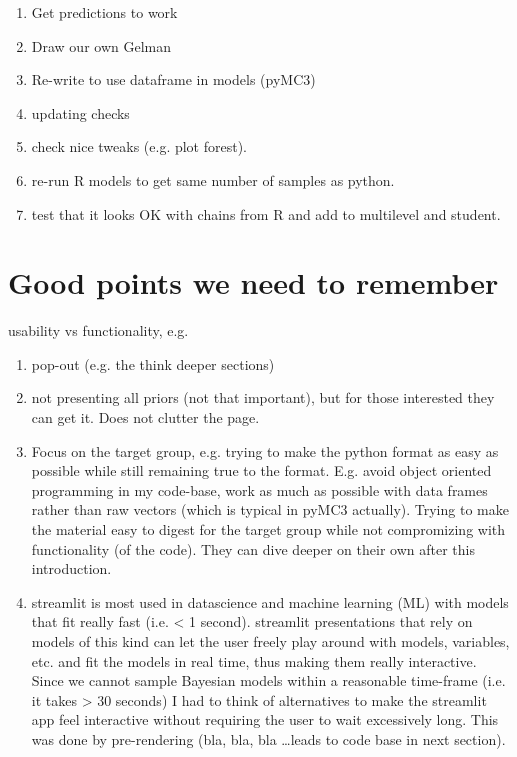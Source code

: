 \documentclass[12pt]{article}
\begin{document}
\begin{enumerate}
	\item Get predictions to work \\
	\item Draw our own Gelman \\
	\item Re-write to use dataframe in models (pyMC3) \\
	\item updating checks \\
	\item check nice tweaks (e.g. plot forest). \\
	\item re-run R models to get same number of samples as python. \\
	\item test that it looks OK with chains from R and add to multilevel
		and student.
\end{enumerate}

\section{Good points we need to remember}

usability vs functionality, e.g.
\begin{enumerate}
	\item pop-out (e.g. the think deeper sections) \\
	\item not presenting all priors (not that important), but for those
		interested they can get it. Does not clutter the page. \\
	\item Focus on the target group, e.g. trying to make the python format
		as easy as possible while still remaining true to the format.
		E.g. avoid object oriented programming in my code-base,
		work as much as possible with data frames rather than raw
		vectors (which is typical in pyMC3 actually). Trying to make
		the material easy to digest for the target group while not
		compromizing with functionality (of the code). They can dive
		deeper on their own after this introduction. \\
	\item streamlit is most used in datascience and machine learning (ML)
		with models that fit really fast (i.e. < 1 second). streamlit
		presentations that rely on models of this kind can let the user
		freely play around with models, variables, etc. and fit the
		models in real time, thus making them really interactive.
		Since we cannot sample Bayesian models within a reasonable time-frame
		(i.e. it takes > 30 seconds) I had to think of alternatives
		to make the streamlit app feel interactive without requiring
		the user to wait excessively long. This was done by
		pre-rendering (bla, bla, bla \ldots leads to code base in next
		section).
\end{enumerate}
\end{document}
